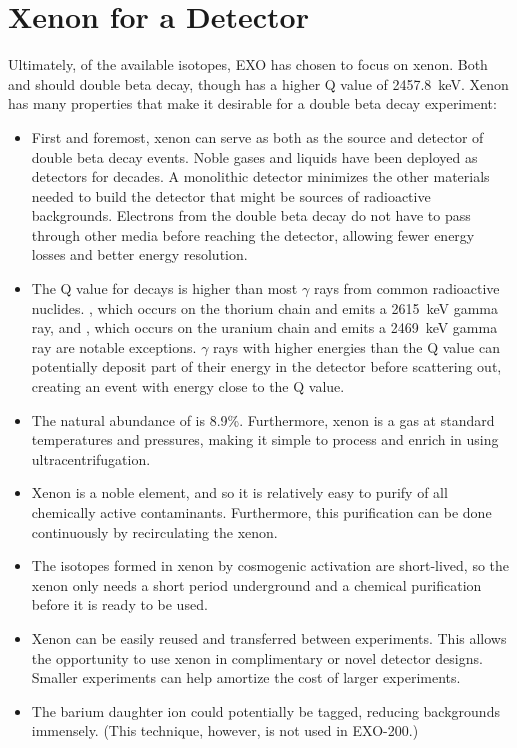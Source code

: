 \documentclass[herrin-thesis.tex]{subfiles}
\begin{document}
\section{Xenon for a Detector}
Ultimately, of the available isotopes, EXO has chosen to focus on xenon. Both  and  should double beta decay, though  has a higher Q value of \SI{2457.8}{\keV}\cite{Redshaw:2007cr}. Xenon has many properties that make it desirable for a double beta decay experiment:
\begin{itemize}
\item First and foremost, xenon can serve as both as the source and detector of double beta decay events. Noble gases and liquids have been deployed as detectors for decades. A monolithic detector minimizes the other materials needed to build the detector that might be sources of radioactive backgrounds. Electrons from the double beta decay do not have to pass through other media before reaching the detector, allowing fewer energy losses and better energy resolution.
\item The Q value for  decays is higher than most \(\gamma\) rays from common radioactive nuclides. , which occurs on the thorium chain and emits a \SI{2615}{\keV} gamma ray, and , which occurs on the uranium chain and emits a \SI{2469}{\keV} gamma ray are notable exceptions. \(\gamma\) rays with higher energies than the Q value can potentially deposit part of their energy in the detector before scattering out, creating an event with energy close to the Q value.
\item The natural abundance of  is 8.9\%. Furthermore, xenon is a gas at standard temperatures and pressures, making it simple to process and enrich in  using ultracentrifugation.
\item Xenon is a noble element, and so it is relatively easy to purify of all chemically active contaminants. Furthermore, this purification can be done continuously by recirculating the xenon.
\item The isotopes formed in xenon by cosmogenic activation are short-lived, so the xenon only needs a short period underground and a chemical purification before it is ready to be used.
\item Xenon can be easily reused and transferred between experiments. This allows the opportunity to use xenon in complimentary or novel detector designs. Smaller experiments can help amortize the cost of larger experiments.
\item The barium daughter ion could potentially be tagged, reducing backgrounds immensely. (This technique, however, is not used in EXO-200.)
\end{itemize}
\end{document}
